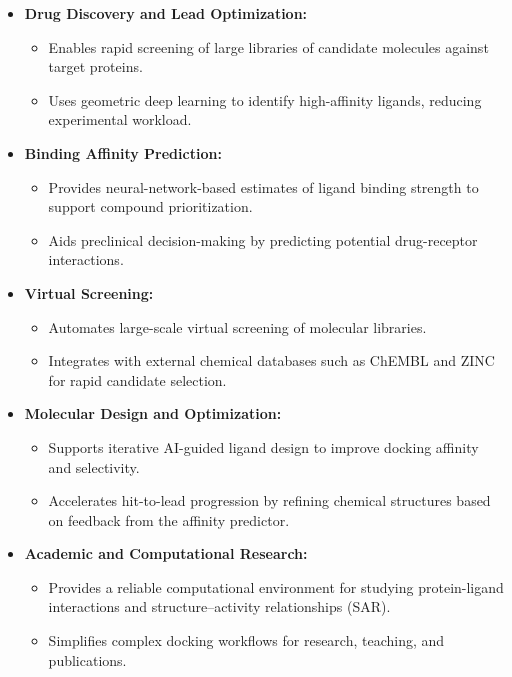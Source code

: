 \documentclass[12pt,a4]{report}
\begin{document}
\begin{itemize}
    \item \textbf{Drug Discovery and Lead Optimization:}
    \begin{itemize}
        \item Enables rapid screening of large libraries of candidate molecules against target proteins.
        \item Uses geometric deep learning to identify high-affinity ligands, reducing experimental workload.
    \end{itemize}

    \item \textbf{Binding Affinity Prediction:}
    \begin{itemize}
        \item Provides neural-network-based estimates of ligand binding strength to support compound prioritization.
        \item Aids preclinical decision-making by predicting potential drug-receptor interactions.
    \end{itemize}

    \item \textbf{Virtual Screening:}
    \begin{itemize}
        \item Automates large-scale virtual screening of molecular libraries.
        \item Integrates with external chemical databases such as ChEMBL and ZINC for rapid candidate selection.
    \end{itemize}

    \item \textbf{Molecular Design and Optimization:}
    \begin{itemize}
        \item Supports iterative AI-guided ligand design to improve docking affinity and selectivity.
        \item Accelerates hit-to-lead progression by refining chemical structures based on feedback from the affinity predictor.
    \end{itemize}

    \item \textbf{Academic and Computational Research:}
    \begin{itemize}
        \item Provides a reliable computational environment for studying protein-ligand interactions and structure–activity relationships (SAR).
        \item Simplifies complex docking workflows for research, teaching, and publications.
    \end{itemize}


\end{itemize}
\end{document}
